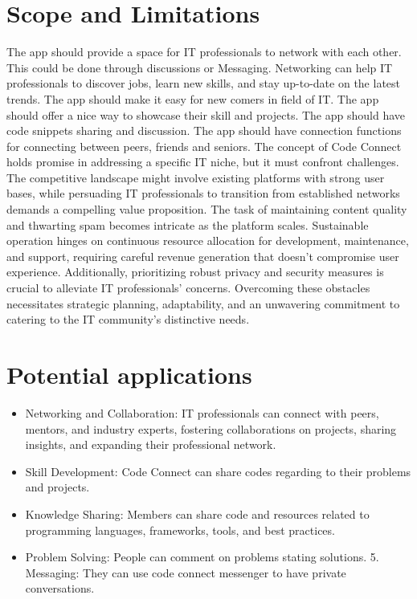\section{Scope and Limitations}


The app should provide a space for IT professionals to network with each other. This could be done through discussions or Messaging. Networking can help IT professionals to discover jobs, learn new skills, and stay up-to-date on the latest trends.
The app should make it easy for new comers in field of IT.
The app should offer a nice way to showcase their skill and projects.
The app should have code snippets sharing and discussion.
The app should have connection functions for connecting between peers, friends and seniors.
\newline
\newline
The concept of Code Connect holds promise in addressing a specific IT niche, but it must confront challenges. The competitive landscape might involve existing platforms with strong user bases, while persuading IT professionals to transition from established networks demands a compelling value proposition. The task of maintaining content quality and thwarting spam becomes intricate as the platform scales. Sustainable operation hinges on continuous resource allocation for development, maintenance, and support, requiring careful revenue generation that doesn't compromise user experience. Additionally, prioritizing robust privacy and security measures is crucial to alleviate IT professionals' concerns. Overcoming these obstacles necessitates strategic planning, adaptability, and an unwavering commitment to catering to the IT community's distinctive needs.
\section{Potential applications}
\begin{itemize}
    \item Networking and Collaboration: IT professionals can connect with peers, mentors, and industry experts, fostering collaborations on projects, sharing insights, and expanding their professional network.
    \item Skill Development: Code Connect can share codes regarding to their problems and projects.
    \item Knowledge Sharing: Members can share code and resources related to programming languages, frameworks, tools, and best practices.
    \item Problem Solving: People can comment on problems stating solutions.  5. Messaging: They can use code connect messenger to have private conversations.
  \end{itemize}
